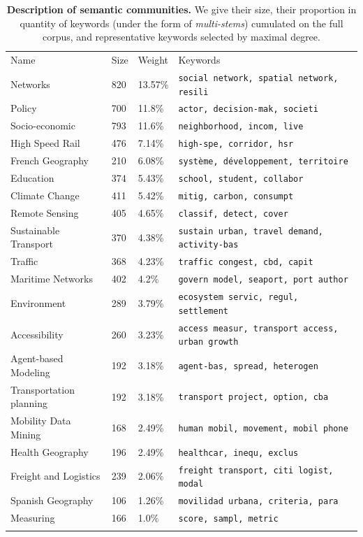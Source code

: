 \documentclass[10pt]{article}
\begin{document}
\begin{table}
\caption{\textbf{Description of semantic communities.} We give their size, their proportion in quantity of keywords (under the form of \emph{multi-stems}) cumulated on the full corpus, and representative keywords selected by maximal degree.\label{tab:semanticdomains}}
\begin{center}
\begin{tabular}{llll}
\hline\noalign{\smallskip}
Name & Size & Weight & Keywords  \\
\noalign{\smallskip}\hline\noalign{\smallskip}
Networks & 820 & 13.57\% & \texttt{social network, spatial network, resili} \\
Policy & 700 & 11.8\% & \texttt{actor, decision-mak, societi} \\
Socio-economic & 793 & 11.6\% & \texttt{neighborhood, incom, live} \\
High Speed Rail & 476 & 7.14\% & \texttt{high-spe, corridor, hsr} \\
French Geography & 210 & 6.08\% & \texttt{système, développement, territoire} \\
Education & 374 & 5.43\% & \texttt{school, student, collabor} \\
Climate Change & 411 & 5.42\% & \texttt{mitig, carbon, consumpt} \\
Remote Sensing & 405 & 4.65\% & \texttt{classif, detect, cover} \\
Sustainable Transport & 370 & 4.38\% & \texttt{sustain urban, travel demand, activity-bas} \\
Traffic & 368 & 4.23\% & \texttt{traffic congest, cbd, capit} \\
Maritime Networks & 402 & 4.2\% & \texttt{govern model, seaport, port author} \\
Environment & 289 & 3.79\% & \texttt{ecosystem servic, regul, settlement} \\
Accessibility & 260 & 3.23\% & \texttt{access measur, transport access, urban growth} \\
Agent-based Modeling & 192 & 3.18\% & \texttt{agent-bas, spread, heterogen} \\
Transportation planning & 192 & 3.18\% & \texttt{transport project, option, cba} \\
Mobility Data Mining & 168 & 2.49\% & \texttt{human mobil, movement, mobil phone} \\
Health Geography & 196 & 2.49\% & \texttt{healthcar, inequ, exclus} \\
Freight and Logistics & 239 & 2.06\% & \texttt{freight transport, citi logist, modal} \\
Spanish Geography & 106 & 1.26\% & \texttt{movilidad urbana, criteria, para} \\
Measuring & 166 & 1.0\% & \texttt{score, sampl, metric} \\
\noalign{\smallskip}\hline
\end{tabular}
\end{center}
\end{table}
\end{document}
